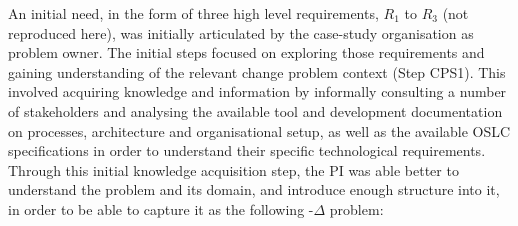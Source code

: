 \documentclass[runningheads,a4paper]{llncs}
\begin{document}

 An initial need, in the form of three high level requirements, $R_1$ to $R_3$ (not reproduced here), was initially articulated by the case-study organisation as problem owner. The initial steps focused on exploring those requirements and gaining understanding of the relevant change problem context (Step CPS1). This involved acquiring knowledge and information by informally consulting a number of stakeholders and analysing the available tool and development documentation on processes, architecture and organisational setup, as well as the available OSLC specifications in order to understand their specific technological requirements. Through this initial knowledge acquisition step, the PI was able better to understand the problem and its domain, and introduce enough structure into it, in order to be able to capture it as the following \POE{}-$\Delta$ problem:
\end{document}
